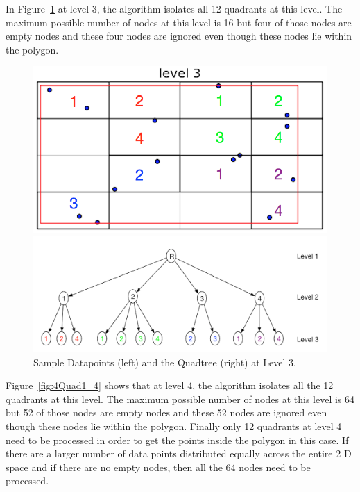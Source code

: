 In Figure~\ref{fig:quad_4_3} 
at level 3, the algorithm  isolates all 12 quadrants at this level. The maximum possible number of nodes at this level is 16 but four of  those nodes are empty nodes and these four nodes are ignored even though these nodes lie within the polygon.
\begin{figure}[H]
  \centering
  \vspace{0.5in}
  \begin{minipage}[b]{0.35\textwidth}
    \includegraphics[width=\textwidth]{Images/4Quad1_3}
  \end{minipage}
  \hfill
  \begin{minipage}[b]{0.6\textwidth}
    \includegraphics[width=\textwidth]{Images/1_1Quad_3_tree}
  \end{minipage}
  \vspace{0.5in}
  \caption{Sample Datapoints (left) and the Quadtree (right) at Level 3.}
  \label{fig:quad_4_3}
\end{figure}

Figure~\ref{fig:4Quad1_4} shows that at level 4, the algorithm isolates all the 12 quadrants at this level. The maximum possible number of nodes at this level is 64 but 52 of those nodes are empty nodes and  these 52 nodes are ignored even though these nodes lie within the polygon.
Finally only 12 quadrants at level 4 need to be processed in order to get the points inside the polygon in this case. If there are a larger number of data points distributed equally across the entire 2 D space and if there are no empty nodes, then all the 64 nodes need to be processed.

